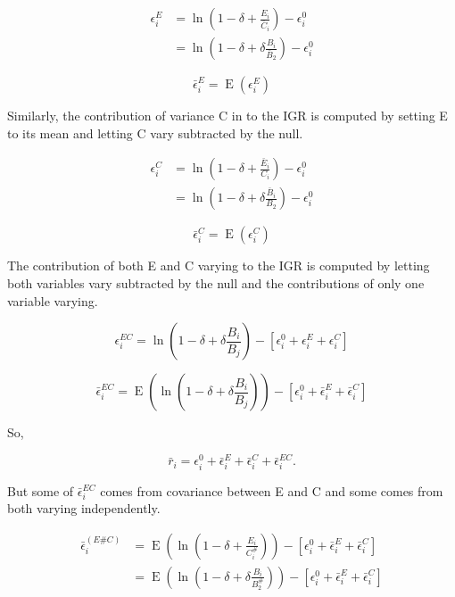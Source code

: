 \documentclass[letterpaper,11pt]{article}
\DeclareMathOperator{\EX}{E}%
\begin{document}
\begin{align}
\epsilon_i^E &=\ln(1-\delta + \frac{E_i}{\bar C_i}) -  \epsilon_i^0 \\
&=\ln(1-\delta + \delta \frac{B_i}{\bar B_2}) -  \epsilon_i^0 
\end{align}

\begin{equation}
\bar \epsilon_i^E=\EX(\epsilon_i^E) \label{Evar_mean}
\end{equation}

Similarly, the contribution of variance C in to the IGR is computed by setting E to its mean and letting C vary subtracted by the null. 

\begin{align}
\epsilon_i^C &=\ln(1-\delta + \frac{\bar E_i}{C_i}) -  \epsilon_i^0 \\
 &=\ln(1-\delta + \delta \frac{\bar B_i}{ B_2}) -  \epsilon_i^0 
\end{align}

\begin{equation}
\bar \epsilon_i^C=\EX(\epsilon_i^C) \label{Cvar_mean}
\end{equation}

The contribution of both E and C varying to the IGR is computed by letting both variables vary subtracted by the null and the contributions of only one variable varying.

\begin{equation}
\epsilon_i^{EC}=\ln(1-\delta + \delta \frac{B_i}{B_j}) -  [\epsilon_i^0 + \epsilon_i^E + \epsilon_i^C] \label{ECvar}
\end{equation}

\begin{equation}
\bar \epsilon_i^{EC}=\EX(\ln(1-\delta + \delta \frac{B_i}{B_j})) -[\epsilon_i^0 +\bar \epsilon_i^E + \bar \epsilon_i^C] \label{ECvar_mean}
\end{equation}

So,

\begin{equation}
\bar r_i=\epsilon_i^0 +\bar \epsilon_i^E + \bar \epsilon_i^C + \bar \epsilon_i^{EC}. \label{rbari_decomp}
\end{equation}

But some of $\bar \epsilon_i^{EC}$ comes from covariance between E and C and some comes from both varying independently.

\begin{align}
\bar \epsilon_i^{(E\#C)} &=\EX(\ln(1-\delta + \frac{E_i}{C_i^{\#}})) -[\epsilon_i^0 +\bar \epsilon_i^E + \bar \epsilon_i^C] \\
 &=\EX(\ln(1-\delta + \delta \frac{B_i}{B_2^{\#}})) -[\epsilon_i^0 +\bar \epsilon_i^E + \bar \epsilon_i^C] 
\end{align}
\end{document}
